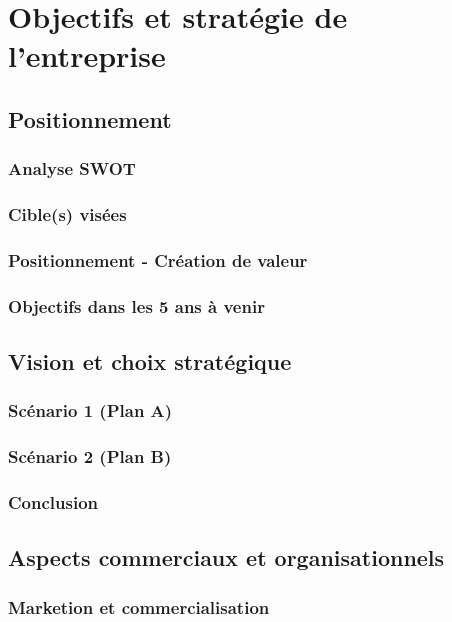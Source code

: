\documentclass[a4paper]{report}
\begin{document}
\chapter{Objectifs et stratégie de l'entreprise}
\section{Positionnement}

\subsection{Analyse SWOT}

\subsection{Cible(s) visées}

\subsection{Positionnement - Création de valeur}

\subsection{Objectifs dans les 5 ans à venir}

\section{Vision et choix stratégique}

\subsection{Scénario 1 (Plan A)}

\subsection{Scénario 2 (Plan B)}

\subsection{Conclusion}

\section{Aspects commerciaux et organisationnels}

\subsection{Marketion et commercialisation}
\end{document}
